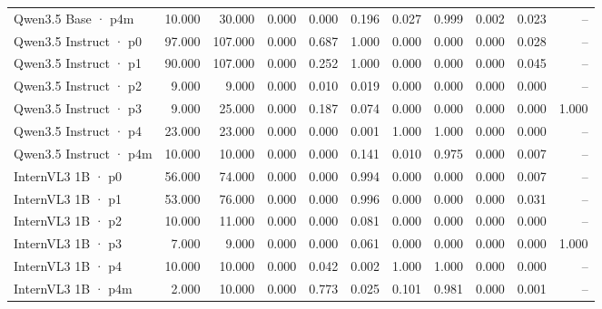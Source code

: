 \begin{tabular}{lrrrrrrrrrr}
Qwen3.5 Base · p4m & 10.000 & 30.000 & 0.000 & 0.000 & 0.196 & 0.027 & 0.999 & 0.002 & 0.023 & -- \\
Qwen3.5 Instruct · p0 & 97.000 & 107.000 & 0.000 & 0.687 & 1.000 & 0.000 & 0.000 & 0.000 & 0.028 & -- \\
Qwen3.5 Instruct · p1 & 90.000 & 107.000 & 0.000 & 0.252 & 1.000 & 0.000 & 0.000 & 0.000 & 0.045 & -- \\
Qwen3.5 Instruct · p2 & 9.000 & 9.000 & 0.000 & 0.010 & 0.019 & 0.000 & 0.000 & 0.000 & 0.000 & -- \\
Qwen3.5 Instruct · p3 & 9.000 & 25.000 & 0.000 & 0.187 & 0.074 & 0.000 & 0.000 & 0.000 & 0.000 & 1.000 \\
Qwen3.5 Instruct · p4 & 23.000 & 23.000 & 0.000 & 0.000 & 0.001 & 1.000 & 1.000 & 0.000 & 0.000 & -- \\
Qwen3.5 Instruct · p4m & 10.000 & 10.000 & 0.000 & 0.000 & 0.141 & 0.010 & 0.975 & 0.000 & 0.007 & -- \\
InternVL3 1B · p0 & 56.000 & 74.000 & 0.000 & 0.000 & 0.994 & 0.000 & 0.000 & 0.000 & 0.007 & -- \\
InternVL3 1B · p1 & 53.000 & 76.000 & 0.000 & 0.000 & 0.996 & 0.000 & 0.000 & 0.000 & 0.031 & -- \\
InternVL3 1B · p2 & 10.000 & 11.000 & 0.000 & 0.000 & 0.081 & 0.000 & 0.000 & 0.000 & 0.000 & -- \\
InternVL3 1B · p3 & 7.000 & 9.000 & 0.000 & 0.000 & 0.061 & 0.000 & 0.000 & 0.000 & 0.000 & 1.000 \\
InternVL3 1B · p4 & 10.000 & 10.000 & 0.000 & 0.042 & 0.002 & 1.000 & 1.000 & 0.000 & 0.000 & -- \\
InternVL3 1B · p4m & 2.000 & 10.000 & 0.000 & 0.773 & 0.025 & 0.101 & 0.981 & 0.000 & 0.001 & -- \\
\bottomrule
\end{tabular}
